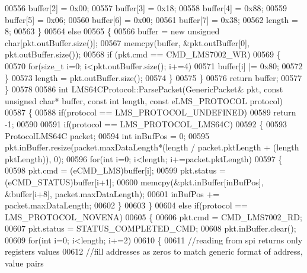 \begin{DoxyCode}
{{{{{00556             buffer[2] = 0x00;
00557             buffer[3] = 0x18;
00558             buffer[4] = 0x88;
00559             buffer[5] = 0x06;
00560             buffer[6] = 0x00;
00561             buffer[7] = 0x38;
00562             length = 8;
00563         \}
00564         \textcolor{keywordflow}{else}
00565         \{
00566             buffer = \textcolor{keyword}{new} \textcolor{keywordtype}{unsigned} \textcolor{keywordtype}{char}[pkt.outBuffer.size()];
00567             memcpy(buffer, &pkt.outBuffer[0], pkt.outBuffer.size());
00568             \textcolor{keywordflow}{if} (pkt.cmd == CMD_LMS7002_WR)
00569             \{
00570                 \textcolor{keywordflow}{for}(\textcolor{keywordtype}{size\_t} i=0; i<pkt.outBuffer.size(); i+=4)
00571                     buffer[i] |= 0x80;
00572             \}
00573             length = pkt.outBuffer.size();
00574         \}
00575     \}
00576     \textcolor{keywordflow}{return} buffer;
00577 \}
00578 
00586 \textcolor{keywordtype}{int} LMS64CProtocol::ParsePacket(GenericPacket& pkt, \textcolor{keyword}{const} \textcolor{keywordtype}{unsigned} \textcolor{keywordtype}{char}* buffer, \textcolor{keyword}{const} \textcolor{keywordtype}{int} 
      length, \textcolor{keyword}{const} eLMS_PROTOCOL protocol)
00587 \{
00588     \textcolor{keywordflow}{if}(protocol == LMS_PROTOCOL_UNDEFINED)
00589         \textcolor{keywordflow}{return} -1;
00590 
00591     \textcolor{keywordflow}{if}(protocol == LMS_PROTOCOL_LMS64C)
00592     \{
00593         ProtocolLMS64C packet;
00594         \textcolor{keywordtype}{int} inBufPos = 0;
00595         pkt.inBuffer.resize(packet.maxDataLength*(length / packet.pktLength + (length %
      pktLength)), 0);
00596         \textcolor{keywordflow}{for}(\textcolor{keywordtype}{int} i=0; i<length; i+=packet.pktLength)
00597         \{
00598             pkt.cmd = (eCMD_LMS)buffer[i];
00599             pkt.status = (eCMD_STATUS)buffer[i+1];
00600             memcpy(&pkt.inBuffer[inBufPos], &buffer[i+8], packet.maxDataLength);
00601             inBufPos += packet.maxDataLength;
00602         \}
00603     \}
00604     \textcolor{keywordflow}{else} \textcolor{keywordflow}{if}(protocol == LMS_PROTOCOL_NOVENA)
00605     \{
00606         pkt.cmd = CMD_LMS7002_RD;
00607         pkt.status = STATUS_COMPLETED_CMD;
00608         pkt.inBuffer.clear();
00609         \textcolor{keywordflow}{for}(\textcolor{keywordtype}{int} i=0; i<length; i+=2)
00610         \{
00611             \textcolor{comment}{//reading from spi returns only registers values}
00612             \textcolor{comment}{//fill addresses as zeros to match generic format of address, value pairs}
}}}}}
\end{DoxyCode}
